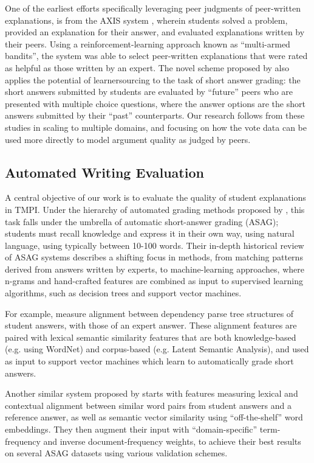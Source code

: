 \documentclass[notitlepage,12pt]{jedm}
\begin{document}
One of the earliest efforts specifically leveraging peer judgments of 
peer-written explanations, is from the AXIS system \cite{williams_axis:_2016}, 
wherein students solved a problem, provided an explanation for their answer, 
and evaluated explanations written by their peers.
Using a reinforcement-learning approach known as ``multi-armed bandits'', the 
system was able to select peer-written explanations that were rated as helpful 
as those written by an expert.
The novel scheme proposed by  also applies the potential 
of learnersourcing to the task of short answer grading: the short answers 
submitted by students are evaluated by ``future'' peers who are presented with 
multiple choice questions, where the answer options are the short answers 
submitted by their ``past'' counterparts.
Our research follows from these studies in scaling to multiple domains, and 
focusing on how the vote data can be used more directly to model argument 
quality as judged by peers.



\subsection{Automated Writing Evaluation}

A central objective of our work is to evaluate the quality of student 
explanations in TMPI.
Under the hierarchy of automated grading methods proposed by  
, this task falls under the umbrella of automatic 
short-answer grading (ASAG); students must recall knowledge and express it 
in their own way, using natural language, using typically between 10-100 words. 
Their in-depth historical review of ASAG systems describes a shifting focus in 
methods, from matching patterns derived from answers written by experts, to 
machine-learning approaches, where n-grams and hand-crafted features are 
combined as input to supervised learning algorithms, such as decision trees and 
support vector machines.

For example,  measure alignment between dependency 
parse tree structures of student answers, with those of an expert answer.
These alignment features are paired with lexical semantic similarity features 
that are both knowledge-based (e.g. using WordNet) and corpus-based (e.g. 
Latent Semantic Analysis), and used as input to support vector machines which 
learn to automatically grade short answers.

Another similar system proposed by  starts with 
features measuring lexical and contextual alignment between similar word pairs 
from student answers and a reference answer, as well as semantic vector 
similarity using ``off-the-shelf'' word embeddings.  
They then augment their input with  ``domain-specific'' term-frequency and 
inverse document-frequency weights, to achieve their best results on several 
ASAG datasets using various validation schemes.
 
\end{document}
